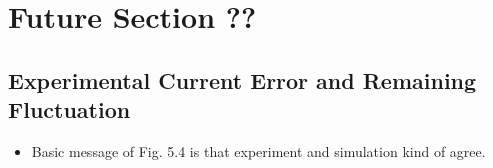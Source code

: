 
\section{Future Section ??}\label{sec:metrics_res}

\subsection{Experimental Current Error and Remaining Fluctuation}

\begin{itemize}
\item Basic message of Fig. 5.4 is that experiment and simulation kind of agree.
\end{itemize}

